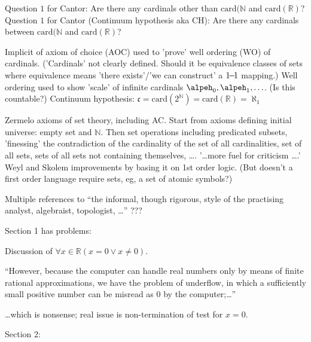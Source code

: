 Question $1$ for Cantor:
\hfill\break
Are there any cardinals other than 
$\mathrm{card}(\mathbb{N}$ and 
$\mathrm{card}(\mathbb{R})$?
\hfill\break
Question $1$ for Cantor (Continuum hypothesis aka CH):
\hfill\break
Are there any cardinals between
$\mathrm{card}(\mathbb{N}$ and 
$\mathrm{card}(\mathbb{R})$?

Implicit of axiom of choice (AOC) used to 'prove' 
well ordering (WO) of cardinals.
('Cardinals' not clearly defined.
Should it be equivalence classes of sets where
equivalence means 'there exists'/'we can construct'
a $1{\!}{-}{\!}1$ mapping.)
\hfill\break
Well ordering used to show 'scale' of infinite cardinals
$\alpeh_0, \alpeh_1, \ldots$. (Is this countable?)
\hfill\break
Continuum hypothesis: 
$\mathfrak{c} = \mathrm{card}(2^{\mathbb{N}}) 
= \mathrm{card}(\mathbb{R}) = \aleph_1$
\hfill\break

Zermelo axioms of set theory, including AC.
Start from axioms defining initial universe:
empty set and $\mathbb{N}$.
Then set operations including predicated subsets,
'finessing' the contradiction of the
cardinality of the set of all cardinalities,
set of all sets,
sets of all sets not containing themselves, 
\ldots.
\hfill\break
'\ldots more fuel for criticism \ldots.'
Weyl and Skolem improvements by basing it on 1st order logic.
(But doesn't a first order language require sets,
eg, a set of atomic symbols?)


\label{sec:Constructivism_SEP}
\cite{sep:mathematics_constructive}

Multiple references to ``the informal, though rigorous, 
style of the practising analyst, algebraist, topologist, \ldots''
???

Section 1 has problems:

Discussion of
$ \forall x \in \mathbb{R} (x = 0 \vee x \ne 0)$.

``However, because the computer can handle real numbers 
only by means of finite rational approximations, 
we have the problem of underflow, 
in which a sufficiently small positive number can be misread as 0 
by the computer;\ldots''

\ldots which is nonsense;
real issue is non-termination of test for $x=0$.

Section 2:

